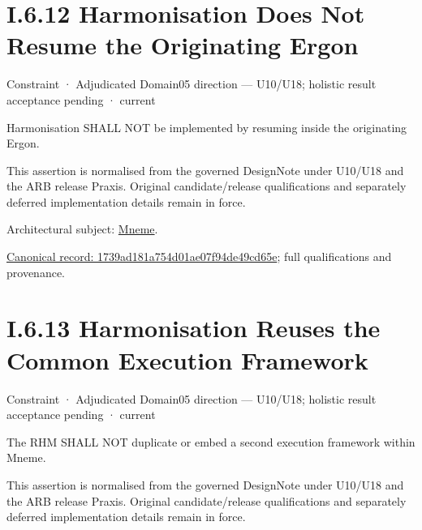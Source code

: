 \section*{I.6.12 Harmonisation Does Not Resume the Originating Ergon}
\label{navigation:I.6.12}

\label{element:1739ad181a754d01ae07f94de49cd65e}
{\small Constraint · Adjudicated Domain05 direction — U10/U18; holistic result acceptance pending · current}\par

Harmonisation SHALL NOT be implemented by resuming inside the originating Ergon.



This assertion is normalised from the governed DesignNote under U10/U18 and the ARB release Praxis. Original candidate/release qualifications and separately deferred implementation details remain in force.



Architectural subject: \hyperref[element:1af8a56358f7429fabfb57be66542a99]{Mneme}.


{\footnotesize \href{../../../../../../../../continuum/motivation/constraint/1739ad181a754d01ae07f94de49cd65e.md}{Canonical record: 1739ad181a754d01ae07f94de49cd65e}; full qualifications and provenance.}\par
\section*{I.6.13 Harmonisation Reuses the Common Execution Framework}
\label{navigation:I.6.13}

\label{element:59e1a236500240609a78b6529fe8e358}
{\small Constraint · Adjudicated Domain05 direction — U10/U18; holistic result acceptance pending · current}\par

The RHM SHALL NOT duplicate or embed a second execution framework within Mneme.



This assertion is normalised from the governed DesignNote under U10/U18 and the ARB release Praxis. Original candidate/release qualifications and separately deferred implementation details remain in force.



